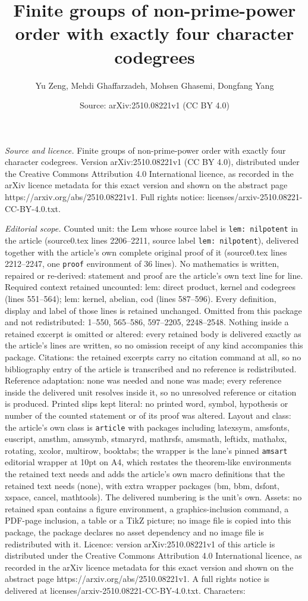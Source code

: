 \documentclass[10pt,a4paper]{amsart}
\title[Finite groups of non-prime-power order with exactly four cha]{Finite groups of non-prime-power order with exactly four character codegrees}
\author{Yu Zeng, Mehdi Ghaffarzadeh, Mohsen Ghasemi, Dongfang Yang}
\date{Source: arXiv:2510.08221v1 (CC BY 4.0)}
\begin{document}
\maketitle

\noindent\emph{Source and licence.} Finite groups of non-prime-power order with exactly four character codegrees. Version arXiv:2510.08221v1 (CC BY 4.0), distributed under the Creative Commons Attribution 4.0 International licence, as recorded in the arXiv licence metadata for this exact version and shown on the abstract page https://arxiv.org/abs/2510.08221v1. Full rights notice: licenses/arxiv-2510.08221-CC-BY-4.0.txt.\par\smallskip

\noindent\textit{Editorial scope.} Counted unit: the Lem whose source label is \texttt{lem: nilpotent} in the article (source0.tex lines 2206--2211, source label \texttt{lem: nilpotent}), delivered together with the article's own complete original proof of it (source0.tex lines 2212--2247, one \texttt{proof} environment of 36 lines). No mathematics is written, repaired or re-derived: statement and proof are the article's own text line for line. Required context retained uncounted: lem: direct product, kernel and codegrees (lines 551--564); lem: kernel, abelian, cod (lines 587--596). Every definition, display and label of those lines is retained unchanged. Omitted from this package and not redistributed: 1--550, 565--586, 597--2205, 2248--2548. Nothing inside a retained excerpt is omitted or altered: every retained body is delivered exactly as the article's lines are written, so no omission receipt of any kind accompanies this package. Citations: the retained excerpts carry no citation command at all, so no bibliography entry of the article is transcribed and no reference is redistributed. Reference adaptation: none was needed and none was made; every reference inside the delivered unit resolves inside it, so no unresolved reference or citation is produced. Printed slips kept literal: no printed word, symbol, hypothesis or number of the counted statement or of its proof was altered. Layout and class: the article's own class is \texttt{article} with packages including latexsym, amsfonts, euscript, amsthm, amssymb, stmaryrd, mathrsfs, amsmath, leftidx, mathabx, rotating, xcolor, multirow, booktabs; the wrapper is the lane's pinned \texttt{amsart} editorial wrapper at 10pt on A4, which restates the theorem-like environments the retained text needs and adds the article's own macro definitions that the retained text needs (none), with extra wrapper packages (bm, bbm, dsfont, xspace, cancel, mathtools). The delivered numbering is the unit's own. Assets: no retained span contains a figure environment, a graphics-inclusion command, a PDF-page inclusion, a table or a TikZ picture; no image file is copied into this package, the package declares no asset dependency and no image file is redistributed with it. Licence: version arXiv:2510.08221v1 of this article is distributed under the Creative Commons Attribution 4.0 International licence, as recorded in the arXiv licence metadata for this exact version and shown on the abstract page https://arxiv.org/abs/2510.08221v1. A full rights notice is delivered at licenses/arxiv-2510.08221-CC-BY-4.0.txt. Characters: 
\end{document}
